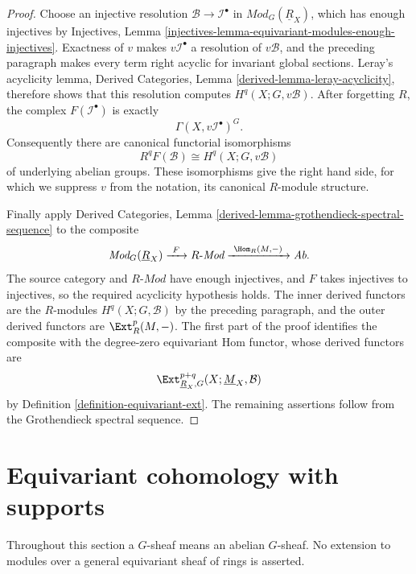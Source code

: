 \begin{proof}
Choose an injective resolution
$\mathcal B\to\mathcal I^\bullet$ in
$\textit{Mod}_G(\underline R_X)$, which has enough injectives by
Injectives, Lemma
\ref{injectives-lemma-equivariant-modules-enough-injectives}. Exactness of
$v$ makes $v\mathcal I^\bullet$ a resolution of $v\mathcal B$, and the
preceding paragraph makes every term right acyclic for invariant global
sections. Leray's acyclicity lemma, Derived Categories, Lemma
\ref{derived-lemma-leray-acyclicity}, therefore shows that this resolution
computes $H^q(X;G,v\mathcal B)$. After forgetting $R$, the complex
$F(\mathcal I^\bullet)$ is exactly
$$
\Gamma(X,v\mathcal I^\bullet)^G.
$$
Consequently there are canonical functorial isomorphisms
$$
R^qF(\mathcal B)\cong H^q(X;G,v\mathcal B)
$$
of underlying abelian groups. These isomorphisms give the right hand side,
for which we suppress $v$ from the notation, its canonical $R$-module
structure.

Finally apply Derived Categories, Lemma
\ref{derived-lemma-grothendieck-spectral-sequence} to the composite
$$
\textit{Mod}_G(\underline R_X)
\xrightarrow{\ F\ }
R\text{-}\textit{Mod}
\xrightarrow{\ \Hom_R(M,-)\ }
\textit{Ab}.
$$
The source category and $R\text{-}\textit{Mod}$ have enough injectives, and
$F$ takes injectives to injectives, so the required acyclicity hypothesis
holds. The inner derived functors are the $R$-modules
$H^q(X;G,\mathcal B)$ by the preceding paragraph, and the outer derived
functors are $\Ext_R^p(M,-)$. The first part of the proof identifies the
composite with the degree-zero equivariant Hom functor, whose derived
functors are
$$
\Ext_{\underline R_X,G}^{p+q}
(X;\underline M_X,\mathcal B)
$$
by Definition \ref{definition-equivariant-ext}. The remaining assertions
follow from the Grothendieck spectral sequence.
\end{proof}


\section{Equivariant cohomology with supports}
\label{section-equivariant-cohomology-supports}

\noindent
Throughout this section a $G$-sheaf means an abelian $G$-sheaf. No extension
to modules over a general equivariant sheaf of rings is asserted.

